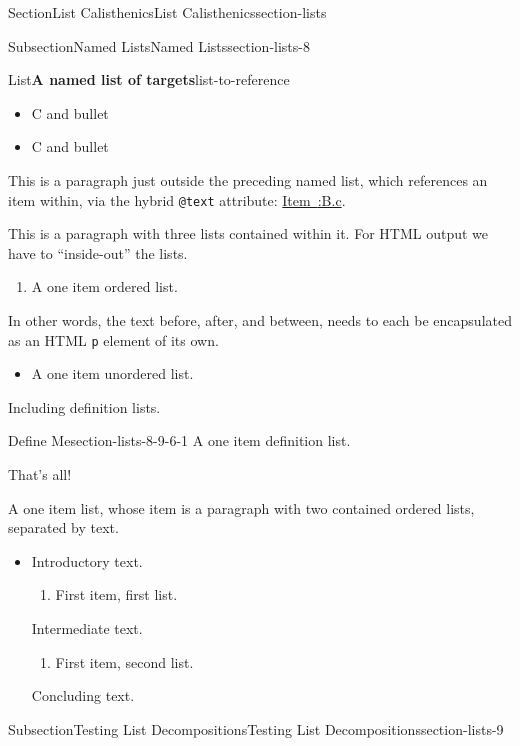 \documentclass[twoside,10pt,]{article}
\newcommand{\xreffont}{\relax}
\newcommand{\mono}[1]{\texttt{#1}}
\numberwithin{equation}{section}
\begin{document}
\begin{sectionptx}{Section}{List Calisthenics}{}{List Calisthenics}{}{}{section-lists}
\begin{subsectionptx}{Subsection}{Named Lists}{}{Named Lists}{}{}{section-lists-8}
\begin{listptx}{List}{\textbf{A named list of targets}}{list-to-reference}{}
\begin{enumerate}[label={\Alph*}]
\begin{itemize}[label=\textbullet]
\begin{enumerate}[label={\arabic*}]
\end{enumerate}
%
\item{}C and bullet%
\item{}C and bullet%
\end{itemize}
%
\end{enumerate}
\end{listptx}%
This is a paragraph just outside the preceding named list, which references an item within, via the hybrid \mono{@text} attribute:  \hyperlink{target-item}{Item~{\xreffont 12.4:B.c}}.%
\par
{}This is a paragraph with three lists contained within it.  For HTML output we have to ``inside-out'' the lists.%
\begin{enumerate}
\item{}A one item ordered list.%
\end{enumerate}
In other words, the text before, after, and between, needs to each be encapsulated as an HTML \mono{p} element of its own.%
\begin{itemize}[label=\textbullet]
\item{}A one item unordered list.%
\end{itemize}
Including definition lists.%
\begin{descriptionlist}
\begin{dlimedium}{Define Me}{section-lists-8-9-6-1}%
A one item definition list.%
\end{dlimedium}%
\end{descriptionlist}
That's all!%
\par
A one item list, whose item is a paragraph with two contained ordered lists, separated by text.%
\begin{itemize}[label=$\blacksquare$]
\item{}Introductory text.%
\begin{enumerate}[label={\Alph*}]
\item{}First item, first list.%
\end{enumerate}
Intermediate text.%
\begin{enumerate}[label={\alph*}]
\item{}First item, second list.%
\end{enumerate}
Concluding text.%
\end{itemize}
%
\end{subsectionptx}
%
%
\typeout{************************************************}
\typeout{************************************************}
%
\begin{subsectionptx}{Subsection}{Testing List Decompositions}{}{Testing List Decompositions}{}{}{section-lists-9}

\end{subsectionptx}
\end{sectionptx}
\end{document}
